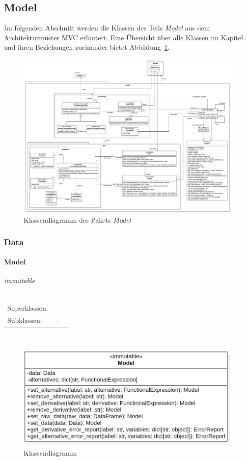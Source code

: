 \documentclass{article}
\newcommand{\classheader}[2][]{\paragraph{#2}
\mbox{}\textit{#1}\\\\}
\newcommand{\classref}[1]{\texttt{\nameref{cls:#1}}}
\begin{document}
\newpage
\subsection{Model}

Im folgenden Abschnitt werden die Klassen des Teils \emph{Model} aus dem Architekturmuster MVC erläutert. Eine Übersicht über alle Klassen im Kapitel und ihren Beziehungen zueinander bietet Abbildung~\ref{fig: ModelKlassendiagramm}.

\begin{figure}[H]%
    \centering
    \includegraphics[width=14cm]{docs/entwurf/Entwurf_dokument/img/modelKlassendiagramm.png}
    \caption{Klassendiagramm des Pakets \emph{Model}}
    \label{fig: ModelKlassendiagramm}
\end{figure}



\newpage
\subsubsection{Data}
\classheader[\flqq{}immutable\frqq]{Model}\label{cls:Model}
\begin{tabular}{lll}
 Superklassen: & --\\
 Subklassen: & --\\
\end{tabular}\\
\begin{figure}[H]%
    \centering
    \includegraphics[width=13cm]{docs/entwurf/Entwurf_dokument/img/cls/model/Model.png}
    \caption{Klassendiagramm \classref{Model}}
\end{figure}
\end{document}
